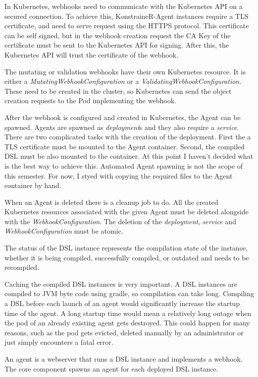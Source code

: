In Kubernetes, webhooks need to communicate with the Kubernetes API on a secured connection. To achieve this, KonstraineR-Agent instances require a TLS certificate, and need to serve request using the HTTPS protocol. This certificate can be self signed, but in the webhook creation request the CA Key of the certificate must be sent to the Kubernetes API for signing. After this, the Kubernetes API will trust the certificate of the webhook.

The mutating or validation webhooks have their own Kubernetes resource. It is either a \emph{MutatingWebhookConfiguration} or a \emph{ValidatingWebhookConfiguration}. These need to be created in the cluster, so Kubernetes can send the object creation requests to the Pod implementing the webhook.

After the webhook is configured and created in Kubernetes, the Agent can be spawned. Agents are spawned as \emph{deployment}s and they also require a \emph{service}. There are two complicated tasks with the creation of the deployment. First the a TLS certificate must be mounted to the Agent container. Second, the compiled DSL must be also mounted to the container. At this point I haven't decided what is the best way to achieve this. Automated Agent spawning is not the scope of this semester. For now, I styed with copying the required files to the Agent container by hand.

When an Agent is deleted there is a cleanup job to do. All the created Kubernetes resources associated with the given Agent must be deleted alongside with the \emph{WebhookConfiguration}. The deletion of the \emph{deployment}, \emph{service} and \emph{WebhookConfiguration} must be atomic.

The status of the DSL instance represents the compilation state of the instance, whether it is being compiled, successfully compiled, or outdated and needs to be recompiled.

Caching the compiled DSL instances is very important. A DSL instances are compiled to JVM byte code using gradle, so compilation can take long. Compiling a DSL before each launch of an agent would significantly increase the startup time of the agent. A long startup time would mean a relatively long outage when the pod of an already existing agent gets destroyed. This could happen for many reasons, such as the pod gets evicted, deleted manually by an administrator or just simply encounters a fatal error.

An agent is a webserver that runs a DSL instance and implements a webhook. The core component spawns an agent for each deployed DSL instance.

